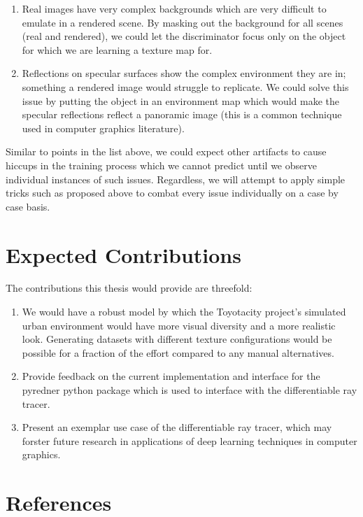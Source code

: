 \documentclass[letterpaper,doc,natbib]{apa6}
\begin{document}
\begin{enumerate}
    \item Real images have very complex backgrounds which are very difficult to emulate in a rendered scene. By masking out the background for all scenes (real and rendered), we could let the discriminator focus only on the object for which we are learning a texture map for.
    \item Reflections on specular surfaces show the complex environment they are in; something a rendered image would struggle to replicate. We could solve this issue by putting the object in an environment map which would make the specular reflections reflect a panoramic image (this is a common technique used in computer graphics literature).
\end{enumerate}

Similar to points in the list above, we could expect other artifacts to cause hiccups in the training process which we cannot predict until we observe individual instances of such issues. Regardless, we will attempt to apply simple tricks such as proposed above to combat every issue individually on a case by case basis.

\section{Expected Contributions}

The contributions this thesis would provide are threefold:

\begin{enumerate}
    \item We would have a robust model by which the Toyotacity project's simulated urban environment would have more visual diversity and a more realistic look. Generating datasets with different texture configurations would be possible for a fraction of the effort compared to any manual alternatives.
    \item Provide feedback on the current implementation and interface for the pyredner python package which is used to interface with the differentiable ray tracer.
    \item Present an exemplar use case of the differentiable ray tracer, which may forster future research in applications of deep learning techniques in computer graphics.
\end{enumerate}

\section{References}


\end{document}
